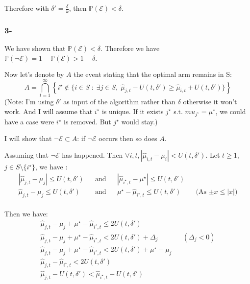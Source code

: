 \documentclass[a4paper]{article}
\newcommand{\wh}[1]{\widehat{#1}}
\begin{document}
Therefore with $\boxed{\delta' = \frac{\delta}{k}}$, then $\mathbb{P}(\mathcal{E}) < \delta$.

\subsubsection*{3-}
We have shown that $\mathbb{P}(\mathcal{E}) < \delta$. Therefore we have $\mathbb{P}(\neg \mathcal{E}) = 1 - \mathbb{P}(\mathcal{E}) > 1 - \delta$.

Now let's denote by $A$ the event stating that the optimal arm remains in S:
\begin{equation*}
    A = \bigcap_{t=1}^\infty\left\{i^\star \notin \Big\{i \in S \;:\; \exists j \in S,\; \wh{\mu}_{j,t} - U(t,\delta') \geq \wh{\mu}_{i,t} + U(t, \delta')  \Big\}\right\}
\end{equation*}
(Note: I'm using $\delta'$ as input of the algorithm rather than $\delta$ otherwise it won't work. And I will assume that $i^\star$ is unique. If
it exists $j^\star$ s.t. $mu_{j^\star} = \mu^\star$, we could have a case were $i^\star$ is removed. But $j^\star$ would stay.)

I will show that $\neg \mathcal{E} \subset A$: if $\neg \mathcal{E}$ occurs then so does $A$.

Assuming that $\neg \mathcal{E}$ has happened. Then $\forall i, t, |\wh{\mu}_{i,t} - \mu_i | < U(t,\delta')$.
Let $t \ge 1$, $j\in S\setminus\{i^\star\}$, we have :
\begin{equation*}
    \begin{aligned}
        |\wh{\mu}_{j,t} - \mu_j | \le U(t,\delta') &  & \text{and} &  & |\wh{\mu}_{i^\star,t} - \mu^\star | \le U(t,\delta')                                   \\
        \wh{\mu}_{j,t} - \mu_j  \le U(t,\delta')   &  & \text{and} &  & \mu^\star - \wh{\mu}_{i^\star,t} \le U(t,\delta')    &  & \text{(As  $\pm x \le |x|$)} \\
    \end{aligned}
\end{equation*}

Then we have:
\begin{equation*}
    \begin{aligned}
        \wh{\mu}_{j,t} - \mu_j + \mu^\star - \wh{\mu}_{i^\star,t} \le 2U(t,\delta')                              \\
        \wh{\mu}_{j,t} - \mu_j + \mu^\star - \wh{\mu}_{i^\star,t} < 2U(t,\delta') + \Delta_j &  & (\Delta_j < 0) \\
        \wh{\mu}_{j,t} - \mu_j + \mu^\star - \wh{\mu}_{i^\star,t} < 2U(t,\delta') + \mu^\star - \mu_j            \\
        \wh{\mu}_{j,t} - \wh{\mu}_{i^\star,t} < 2U(t,\delta')                                                    \\
        \wh{\mu}_{j,t} - U(t,\delta') < \wh{\mu}_{i^\star,t} + U(t,\delta')                                      \\
    \end{aligned}
\end{equation*}
\end{document}
